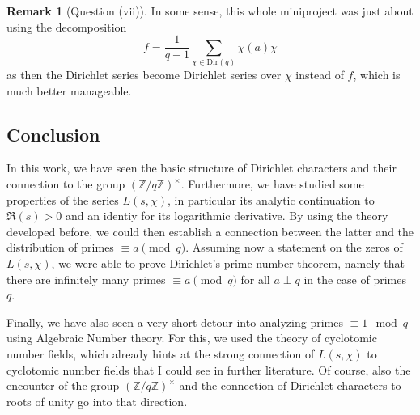 \documentclass{scrartcl}
\newcommand{\Z}{\mathbb{Z}}
\newcommand{\units}{\times}
\theoremstyle{definition}
\newtheorem{remark}[definition]{Remark}
\begin{document}
\begin{remark}[Question (vii)]
    In some sense, this whole miniproject was just about using the decomposition
    \begin{equation*}
        f = \frac 1 {q - 1} \sum_{\chi \in \mathrm{Dir}(q)} \overline{\chi(a)} \chi
    \end{equation*}
    as then the Dirichlet series become Dirichlet series over $\chi$ instead of $f$, which is much better manageable.
\end{remark}

\subsection*{Conclusion}
In this work, we have seen the basic structure of Dirichlet characters and their connection to the group $(\Z/q\Z)^\units$.
Furthermore, we have studied some properties of the series $L(s, \chi)$, in particular its analytic continuation to $\Re(s) > 0$ and an identiy for its logarithmic derivative.
By using the theory developed before, we could then establish a connection between the latter and the distribution of primes $\equiv a \pmod q$.
Assuming now a statement on the zeros of $L(s, \chi)$, we were able to prove Dirichlet's prime number theorem, namely that there are infinitely many primes $\equiv a \pmod q$ for all $a \perp q$ in the case of primes $q$.

Finally, we have also seen a very short detour into analyzing primes $\equiv 1 \mod q$ using Algebraic Number theory.
For this, we used the theory of cyclotomic number fields, which already hints at the strong connection of $L(s, \chi)$ to cyclotomic number fields that I could see in further literature.
Of course, also the encounter of the group $(\Z/q\Z)^\units$ and the connection of Dirichlet characters to roots of unity go into that direction.
\end{document}
